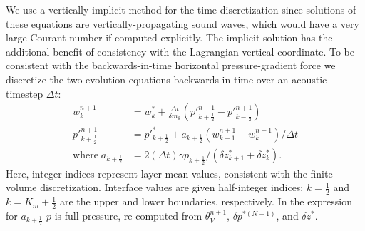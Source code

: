 \documentclass[10pt,letterpaper,margin=1in]{memoir}
\newcommand{\half}{\frac{1}{2}}
\begin{document}
We use a vertically-implicit method for the time-discretization since solutions of these equations are vertically-propagating sound waves, which would have a very large Courant number if computed explicitly. The implicit solution has the additional benefit of consistency with the Lagrangian vertical coordinate. 
To be consistent with the backwards-in-time horizontal pressure-gradient force we discretize the two evolution equations backwards-in-time over an acoustic timestep $\Delta t$:
\begin{subequations}
\begin{align}
w_k^{n+1} &= w^*_k + \frac{\Delta t}{\delta m_k} \left (p'^{n+1}_{k+\half} - p'^{n+1}_{k-\half} \right) \label{eqn:wdt} \\
p'^{n+1}_{k+\half} &= p'^{*}_{k+\half} + a_{k+\half} \left ( w^{n+1}_{k+1} - w^{n+1}_{k} \right) / \Delta t \label{eqn:pdt}  \\
\mathrm{where} \; a_{k+\half}& = 2 \left ( \Delta t \right ) \gamma p_{k+\half} / \left ( \delta z^*_{k+1} + \delta z^*_k \right ).
\end{align}
\end{subequations}
Here, integer indices represent layer-mean values, consistent with the finite-volume discretization. Interface values are given half-integer indices: $k=\half$ and $k=K_m+\half$ are the upper and lower boundaries, respectively. In the expression for $a_{k+\half}$ $p$ is full pressure, re-computed from $\theta_V^{n+1}$, $\delta p^{*(N+1)}$, and $\delta z^*$.
\end{document}
